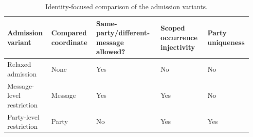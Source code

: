 \begin{table}[p]
  \centering
  \caption{Identity-focused comparison of the admission variants.}
  \label{tab:model-comparison}
  \small
  \begin{tabularx}{\linewidth}{@{}lXXXX@{}}
    \toprule
    Admission variant & Compared coordinate & Same-party/different-message allowed? & Scoped occurrence injectivity & Party uniqueness \\
    \midrule
    Relaxed admission & None & Yes & No & No \\
    Message-level restriction & Message & Yes & Yes & No \\
    Party-level restriction & Party & No & Yes & Yes \\
    \bottomrule
  \end{tabularx}
\end{table}
